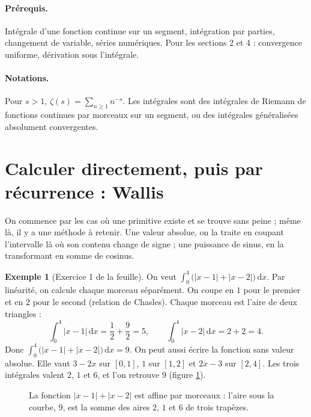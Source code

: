 \documentclass[11pt,a4paper]{article}
\theoremstyle{plain}
\theoremstyle{definition}
\newtheorem{exemple}[theoreme]{Exemple}
\theoremstyle{remark}
\newcommand{\dd}{\,\mathrm{d}}
\begin{document}
\paragraph{Prérequis.} Intégrale d'une fonction continue sur un segment, intégration par parties, changement de variable, séries numériques. Pour les sections 2 et 4 : convergence uniforme, dérivation sous l'intégrale.

\paragraph{Notations.} Pour $s>1$, $\zeta(s)=\sum_{n\geq1}n^{-s}$. Les intégrales sont des intégrales de Riemann de fonctions continues par morceaux sur un segment, ou des intégrales généralisées absolument convergentes.

\tableofcontents

\section{Calculer directement, puis par récurrence : Wallis}

On commence par les cas où une primitive existe et se trouve sans peine ; même là, il y a une méthode à retenir. Une valeur absolue, on la traite en coupant l'intervalle là où son contenu change de signe ; une puissance de sinus, en la transformant en somme de cosinus.

\begin{exemple}[Exercice 1 de la feuille]\label{ex:abs}
On veut $\int_0^4\big(|x-1|+|x-2|\big)\dd x$. Par linéarité, on calcule chaque morceau séparément. On coupe en $1$ pour le premier et en $2$ pour le second (relation de Chasles). Chaque morceau est l'aire de deux triangles :
\[
  \int_0^4|x-1|\dd x=\frac12+\frac92=5,\qquad \int_0^4|x-2|\dd x=2+2=4 .
\]
Donc $\int_0^4\big(|x-1|+|x-2|\big)\dd x=9$.
On peut aussi écrire la fonction sans valeur absolue. Elle vaut $3-2x$ sur $[0,1]$, $1$ sur $[1,2]$ et $2x-3$ sur $[2,4]$. Les trois intégrales valent $2$, $1$ et $6$, et l'on retrouve $9$ (figure \ref{fig:abs}).
\end{exemple}

\begin{figure}[h]
\centering
{}
\caption{La fonction $|x-1|+|x-2|$ est affine par morceaux : l'aire sous la courbe, $9$, est la somme des aires $2$, $1$ et $6$ de trois trapèzes.}\label{fig:abs}
\end{figure}
\end{document}
